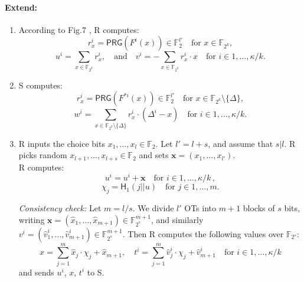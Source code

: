 \documentclass{article}
\begin{document}
\paragraph{Extend:}

  \begin{enumerate}
     \item According to Fig.7 \cite{roy2022softspokenot}, R computes: \\
        \begin{displaymath}
            r_x^{i} = \mathsf{PRG}(F^{i}(x)) \in \mathbb{F}_2^{l'} \quad \textrm{for} \,\, x \in \mathbb{F}_{2^k},
        \end{displaymath}
        \begin{displaymath}
            u^i = \sum_{x \in \mathbb{F}_{2^k}} r_x^{i}, \quad \textrm{and} \quad v^i = -\sum_{x \in \mathbb{F}_{2^k}} r_x^{i} \cdot x \quad \textrm{for} \,\, i \in 1, \dots, \kappa / k.
        \end{displaymath}

    \item S computes: \\
        \begin{displaymath}
            r_x^{i} = \mathsf{PRG}(F^{*i}(x)) \in \mathbb{F}_2^{l'} \quad \textrm{for} \,\, x \in \mathbb{F}_{2^k} \setminus \{\Delta\},
        \end{displaymath}
        \begin{displaymath}
            w^i = \sum_{x \in \mathbb{F}_{2^k} \setminus \{\Delta\}} r_x^{i} \cdot (\Delta^i - x) \quad \textrm{for} \,\, i \in 1, ..., \kappa / k.
        \end{displaymath}

    \item R inputs the choice bits $x_1, \dots, x_l \in \mathbb{F}_2$. Let $l' = l + s$, and assume that $s|l$. R picks random $x_{l+1}, \dots, x_{l+s} \in \mathbb{F}_2$ and sets $\mathbf{x} = (x_1, ..., x_{l'})$. \\

    R computes:
    \begin{displaymath}
        u^i = u^i + \mathbf{x} \quad \textrm{for} \,\, i \in 1, \dots, \kappa / k \,,
    \end{displaymath}
    \begin{displaymath}
        \chi_j = \mathsf{H}_1(j || u) \quad \textrm{for} \,\, j \in 1, \dots, m.
    \end{displaymath}

    \emph{Consistency check:} Let $m = l/s$. We divide $l'$ OTs into $m+1$ blocks of $s$ bits,
        writing $\mathbf{x} = (\hat{x}_1, \dots, \hat{x}_{m+1}) \in \mathbb{F}_{2^s}^{m+1}$,
        and similarly
        $v^i = (\hat{v}^i_1, \dots, \hat{v}^i_{m+1}) \in \mathbb{F}_{2^s}^{m+1}$. Then R computes the following values over $\mathbb{F}_{2^s}$:
    \begin{displaymath}
        x = \sum_{j=1}^m \hat{x}_j \cdot \chi_j + \hat{x}_{m+1}, \quad 
        t^i = \sum_{j=1}^m \hat{v}^i_j \cdot \chi_j + \hat{v}^i_{m+1} \quad \textrm{for} \,\, i \in 1, \dots, \kappa / k
    \end{displaymath}        
    and sends $u^i$, $x$, $t^i$ to S.


\end{enumerate}
\end{document}
